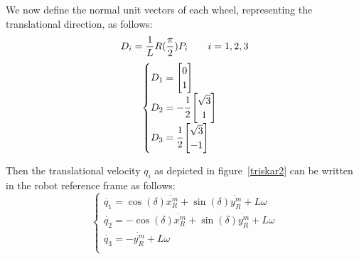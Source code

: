 We now define the normal unit vectors of each wheel, representing the translational direction, as follows:
\begin{equation}
D_i =  \frac{1}{L}R(\frac{\pi}{2})P_i\qquad i=1,2,3 \\
\end{equation}
\begin{equation}
\begin{cases}
D_1 = \begin{bmatrix}0 \\ 1 \end{bmatrix} \\
D_2 = -\cfrac{1}{2}\begin{bmatrix}\sqrt{3} \\ 1 \end{bmatrix} \\
D_3 = \cfrac{1}{2}\begin{bmatrix}\sqrt{3} \\ -1 \end{bmatrix} \\
\end{cases}
\end{equation}

Then the translational velocity $q_i$ as depicted in figure~\ref{triskar2} can be written in the robot reference frame as follows:
\begin{equation}
\begin{cases}
\dot{q_1} =\cos(\delta)\dot{x^m _R}+\sin(\delta)\dot{y^m _R}+L{\omega}\\
\dot{q_2} =-\cos(\delta)\dot{x^m _R}+\sin(\delta)\dot{y^m _R}+L{\omega}\\
\dot{q_3} =-\dot{y^m _R}+L{\omega}\\
\end{cases}
\end{equation}

